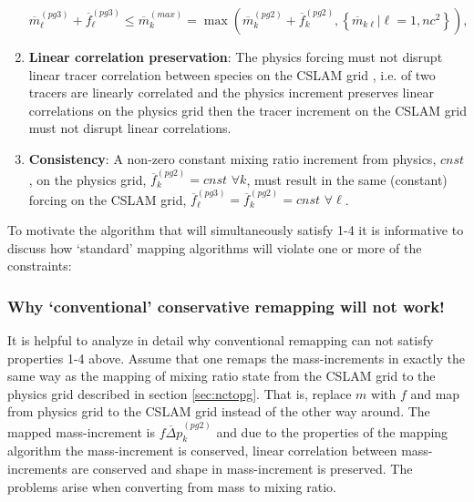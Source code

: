\begin{enumerate}
\begin{equation}
\label{eq:max}
{\overline{m}}^{(pg3)}_\ell+{\overline{f}}^{(pg3)}_\ell \le \overline{m}_k^{(max)}=\max \left( {\overline{m}}^{(pg2)}_k+\overline{f}_k^{(pg2)},\left\{ {\overline{m}}_{k\ell} |\ell=1,nc^2\right\} \right),
\end{equation}
\item {\bf{Linear correlation preservation}}: The physics forcing must not disrupt linear tracer correlation between species on the CSLAM grid \citep[see, e.g., ][]{LT2011QJR}, i.e. of two tracers are linearly correlated and the physics increment preserves linear correlations on the physics grid then the tracer increment on the CSLAM grid must not disrupt linear correlations.
\item {\bf{Consistency}}: A non-zero constant mixing ratio increment from physics, $cnst$, on the physics grid, $\overline{f}_k^{(pg2)}=cnst$ $\forall k$, must result in the same (constant) forcing on the CSLAM grid, $\overline{f}_\ell^{(pg3)}=\overline{f}_k^{(pg2)}=cnst$ $\forall \ell$.
\end{enumerate}
To motivate the algorithm that will simultaneously satisfy 1-4 it is informative to discuss how `standard' mapping algorithms will violate one or more of the constraints:
\subsubsection{Why `conventional' conservative remapping will not work!}\label{sec:why}
It is helpful to analyze in detail why conventional remapping can not satisfy properties 1-4 above. Assume that one remaps the mass-increments in exactly the same way as the mapping of mixing ratio state from the CSLAM grid to the physics grid described in section \ref{sec:nctopg}. That is, replace $m$ with $f$ and map from physics grid to the CSLAM grid instead of the other way around. The mapped mass-increment is $\overline{f\Delta p}^{(pg2)}_k$ and due to the properties of the mapping algorithm the mass-increment is conserved, linear correlation between mass-increments are conserved and shape in mass-increment is preserved. The problems arise when converting from mass to mixing ratio.

